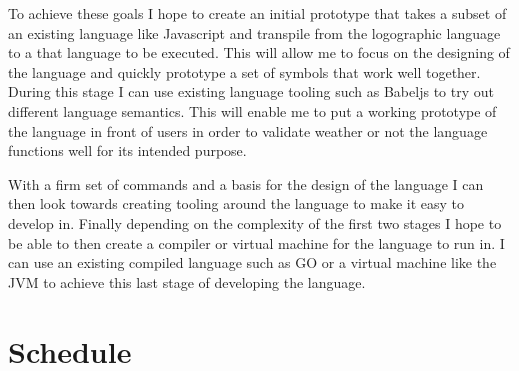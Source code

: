\documentclass[12pt]{article}
\begin{document}
To achieve these goals I hope to create an initial prototype that takes a subset of an existing language like Javascript and transpile from the logographic 
language to a that language to be executed. This will allow me to focus on the designing of the language and quickly prototype a set of symbols that work well together.
During this stage I can use existing language tooling such as Babeljs \parencite{noauthor_babel_nodate} to try out different language semantics. This will enable me to put a working prototype of the language in front of
users in order to validate weather or not the language functions well for its intended purpose.

With a firm set of commands and a basis for the design of the language I can then look towards creating tooling around the language to make it easy to develop in. Finally depending on
the complexity of the first two stages I hope to be able to then create a compiler or virtual machine for the language to run in. I can use an existing compiled language such as GO or a virtual machine like the JVM
to achieve this last stage of developing the language.


\section{Schedule}
\end{document}
